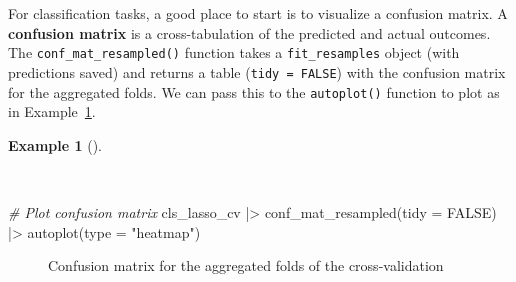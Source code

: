 \documentclass[
  letterpaper,
  krantz1]{latex/krantz-mod}
\newenvironment{Shaded}{\begin{snugshade}}{\end{snugshade}}
\newcommand{\AttributeTok}[1]{\textcolor[rgb]{0.00,0.00,0.00}{#1}}
\newcommand{\CommentTok}[1]{\textcolor[rgb]{0.00,0.00,0.00}{\textit{#1}}}
\newcommand{\ConstantTok}[1]{\textcolor[rgb]{0.00,0.00,0.00}{#1}}
\newcommand{\FunctionTok}[1]{\textcolor[rgb]{0.00,0.00,0.00}{#1}}
\newcommand{\NormalTok}[1]{\textcolor[rgb]{0.00,0.00,0.00}{#1}}
\newcommand{\SpecialCharTok}[1]{\textcolor[rgb]{0.00,0.00,0.00}{#1}}
\newcommand{\StringTok}[1]{\textcolor[rgb]{0.00,0.00,0.00}{#1}}
\theoremstyle{definition}
\newtheorem{example}{Example}[chapter]
\theoremstyle{definition}
\theoremstyle{remark}
\begin{document}
For classification tasks, a good place to start is to visualize a
confusion matrix. A \textbf{confusion matrix} is a cross-tabulation of
the predicted and actual outcomes. The \texttt{conf\_mat\_resampled()}
function takes a \texttt{fit\_resamples} object (with predictions saved)
and returns a table (\texttt{tidy\ =\ FALSE}) with the confusion matrix
for the aggregated folds. We can pass this to the \texttt{autoplot()}
function to plot as in
Example~\ref{exm-predict-class-tune-hyperparameters-evaluate-workflow-cv-confusion}.

\begin{example}[]\protect\hypertarget{exm-predict-class-tune-hyperparameters-evaluate-workflow-cv-confusion}{}\label{exm-predict-class-tune-hyperparameters-evaluate-workflow-cv-confusion}

~

\begin{Shaded}
\begin{Highlighting}[numbers=left,,]
\CommentTok{\# Plot confusion matrix}
\NormalTok{cls\_lasso\_cv }\SpecialCharTok{|\textgreater{}}
  \FunctionTok{conf\_mat\_resampled}\NormalTok{(}\AttributeTok{tidy =} \ConstantTok{FALSE}\NormalTok{) }\SpecialCharTok{|\textgreater{}}
  \FunctionTok{autoplot}\NormalTok{(}\AttributeTok{type =} \StringTok{"heatmap"}\NormalTok{)}
\end{Highlighting}
\end{Shaded}

\end{example}

\begin{figure}[!htb]


\caption{\label{fig-class-tune-hyperparameters-evaluate-workflow-cv-confusion}Confusion
matrix for the aggregated folds of the cross-validation}

\end{figure}%
\end{document}
